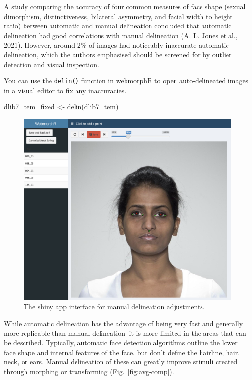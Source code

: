 \documentclass[
  man,floatsintext]{apa6}
\newenvironment{Shaded}{\begin{snugshade}}{\end{snugshade}}
\newcommand{\FunctionTok}[1]{\textcolor[rgb]{0.00,0.00,0.00}{#1}}
\newcommand{\NormalTok}[1]{#1}
\newcommand{\OtherTok}[1]{\textcolor[rgb]{0.56,0.35,0.01}{#1}}
\begin{document}
A study comparing the accuracy of four common measures of face shape (sexual dimorphism, distinctiveness, bilateral asymmetry, and facial width to height ratio) between automatic and manual delineation concluded that automatic delineation had good correlations with manual delineation (A. L. Jones et al., 2021). However, around 2\% of images had noticeably inaccurate automatic delineation, which the authors emphasised should be screened for by outlier detection and visual inspection.

You can use the \texttt{delin()} function in webmorphR to open auto-delineated images in a visual editor to fix any inaccuracies.

\begin{Shaded}
\begin{Highlighting}[]
\NormalTok{dlib7\_tem\_fixed }\OtherTok{\textless{}{-}} \FunctionTok{delin}\NormalTok{(dlib7\_tem)}
\end{Highlighting}
\end{Shaded}

\begin{figure}
\includegraphics[width=1\linewidth]{images/delin} \caption{The shiny app interface for manual delineation adjustments.}\label{fig:delin-shiny}
\end{figure}

While automatic delineation has the advantage of being very fast and generally more replicable than manual delineation, it is more limited in the areas that can be described. Typically, automatic face detection algorithms outline the lower face shape and internal features of the face, but don't define the hairline, hair, neck, or ears. Manual delineation of these can greatly improve stimuli created through morphing or transforming (Fig.~\ref{fig:avg-comp}).
\end{document}

